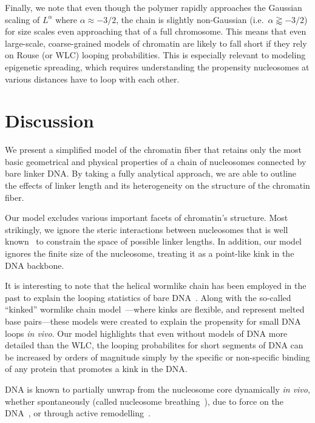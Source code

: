 \documentclass[%
 reprint,
superscriptaddress,
showpacs,preprintnumbers,
 amsmath,amssymb,
 aps,
 prl,
]{revtex4-1}
\begin{document}
Finally, we note that even though the polymer rapidly approaches the Gaussian
    scaling of $L^\alpha$ where $\alpha \approx -3/2$, the chain is slightly
    non-Gaussian (i.e.\ $\alpha \gtrapprox -3/2$) for size scales even
    approaching that of a full chromosome.
This means that even large-scale, coarse-grained models of chromatin are likely
    to fall short if they rely on Rouse (or WLC) looping probabilities.
This is especially relevant to modeling epigenetic spreading, which requires
    understanding the propensity nucleosomes at various distances have to loop with
    each other.

\section{Discussion}

We present a simplified model of the chromatin fiber that retains only the most
    basic geometrical and physical properties of a chain of nucleosomes
    connected by bare linker DNA.\@
By taking a fully analytical approach, we are able to outline the effects of
    linker length and its heterogeneity on the structure of the chromatin fiber.

Our model excludes various important facets of chromatin's structure.
Most strikingly, we ignore the steric interactions between nucleosomes that is
    well known~\cite{widom1992} to constrain the space of possible linker
    lengths.
In addition, our model ignores the finite size of the nucleosome, treating it as
    a point-like kink in the DNA backbone.

It is interesting to note that the helical wormlike chain has been employed
    in the past to explain the looping statistics of bare DNA~\cite{shimada1984,
    liu2011a}.
Along with the so-called ``kinked'' wormlike chain model~\cite{wiggins2005,
    popov2005}---where kinks are flexible, and represent melted base
    pairs---these models were created to explain the propensity for small DNA
    loops \textit{in vivo}.
Our model highlights that even without models of DNA more detailed than the WLC,
    the looping probabilites for short segments of DNA can be increased by
    orders of magnitude simply by the specific or non-specific binding of any
    protein that promotes a kink in the DNA.\@

DNA is known to partially unwrap from the nucleosome core dynamically \textit{in
    vivo}, whether spontaneously (called nucleosome breathing~\cite{TODO}), due to
    force on the DNA~\cite{TODO}, or through active
    remodelling~\cite{dion2007,kulaeva2007,senavirathne2017}.
\end{document}
